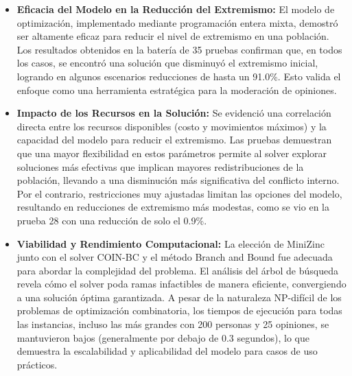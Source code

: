 \documentclass[11pt,letter]{article}
\begin{document}
\begin{itemize}
    \item \textbf{Eficacia del Modelo en la Reducción del Extremismo:} El modelo de optimización, implementado mediante programación entera mixta, demostró ser altamente eficaz para reducir el nivel de extremismo en una población. Los resultados obtenidos en la batería de 35 pruebas confirman que, en todos los casos, se encontró una solución que disminuyó el extremismo inicial, logrando en algunos escenarios reducciones de hasta un 91.0\%. Esto valida el enfoque como una herramienta estratégica para la moderación de opiniones.

    \item \textbf{Impacto de los Recursos en la Solución:} Se evidenció una correlación directa entre los recursos disponibles (costo y movimientos máximos) y la capacidad del modelo para reducir el extremismo. Las pruebas demuestran que una mayor flexibilidad en estos parámetros permite al solver explorar soluciones más efectivas que implican mayores redistribuciones de la población, llevando a una disminución más significativa del conflicto interno. Por el contrario, restricciones muy ajustadas limitan las opciones del modelo, resultando en reducciones de extremismo más modestas, como se vio en la prueba 28 con una reducción de solo el 0.9\%.

    \item \textbf{Viabilidad y Rendimiento Computacional:} La elección de MiniZinc junto con el solver COIN-BC y el método Branch and Bound fue adecuada para abordar la complejidad del problema. El análisis del árbol de búsqueda revela cómo el solver poda ramas infactibles de manera eficiente, convergiendo a una solución óptima garantizada. A pesar de la naturaleza NP-difícil de los problemas de optimización combinatoria, los tiempos de ejecución para todas las instancias, incluso las más grandes con 200 personas y 25 opiniones, se mantuvieron bajos (generalmente por debajo de 0.3 segundos), lo que demuestra la escalabilidad y aplicabilidad del modelo para casos de uso prácticos.
\end{itemize}

\newpage
\nocite{*}
\printbibliography
\end{document}
